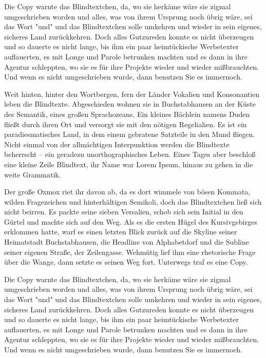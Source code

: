 Die Copy warnte das Blindtextchen, da, wo sie herkäme wäre sie zigmal umgeschrieben worden und alles, was von ihrem Ursprung noch übrig wäre, sei das Wort "und" und das Blindtextchen solle umkehren und wieder in sein eigenes, sicheres Land zurückkehren. Doch alles Gutzureden konnte es nicht überzeugen und so dauerte es nicht lange, bis ihm ein paar heimtückische Werbetexter auflauerten, es mit Longe und Parole betrunken machten und es dann in ihre Agentur schleppten, wo sie es für ihre Projekte wieder und wieder mißbrauchten. Und wenn es nicht umgeschrieben wurde, dann benutzen Sie es immernoch.

Weit hinten, hinter den Wortbergen, fern der Länder Vokalien und Konsonantien leben die Blindtexte. Abgeschieden wohnen sie in Buchstabhausen an der Küste des Semantik, eines großen Sprachozeans. Ein kleines Bächlein namens Duden fließt durch ihren Ort und versorgt sie mit den nötigen Regelialien. Es ist ein paradiesmatisches Land, in dem einem gebratene Satzteile in den Mund fliegen. Nicht einmal von der allmächtigen Interpunktion werden die Blindtexte beherrscht – ein geradezu unorthographisches Leben. Eines Tages aber beschloß eine kleine Zeile Blindtext, ihr Name war Lorem Ipsum, hinaus zu gehen in die weite Grammatik.

Der große Oxmox riet ihr davon ab, da es dort wimmele von bösen Kommata, wilden Fragezeichen und hinterhältigen Semikoli, doch das Blindtextchen ließ sich nicht beirren. Es packte seine sieben Versalien, schob sich sein Initial in den Gürtel und machte sich auf den Weg. Als es die ersten Hügel des Kursivgebirges erklommen hatte, warf es einen letzten Blick zurück auf die Skyline seiner Heimatstadt Buchstabhausen, die Headline von Alphabetdorf und die Subline seiner eigenen Straße, der Zeilengasse. Wehmütig lief ihm eine rhetorische Frage über die Wange, dann setzte es seinen Weg fort. Unterwegs traf es eine Copy.

Die Copy warnte das Blindtextchen, da, wo sie herkäme wäre sie zigmal umgeschrieben worden und alles, was von ihrem Ursprung noch übrig wäre, sei das Wort "und" und das Blindtextchen solle umkehren und wieder in sein eigenes, sicheres Land zurückkehren. Doch alles Gutzureden konnte es nicht überzeugen und so dauerte es nicht lange, bis ihm ein paar heimtückische Werbetexter auflauerten, es mit Longe und Parole betrunken machten und es dann in ihre Agentur schleppten, wo sie es für ihre Projekte wieder und wieder mißbrauchten. Und wenn es nicht umgeschrieben wurde, dann benutzen Sie es immernoch.

